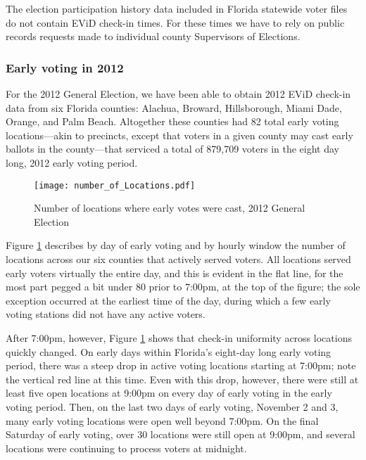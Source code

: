 \documentclass[12pt,titlepage]{article}
\begin{document}
The election participation history data included in Florida statewide
voter files do not contain EViD check-in times.  For these times we
have to rely on public records requests made to individual county
Supervisors of Elections.

\subsubsection*{Early voting in 2012}

For the 2012 General Election, we have been able to obtain 2012 EViD
check-in data from six Florida counties: Alachua, Broward,
Hillsborough, Miami Dade, Orange, and Palm Beach.  Altogether these
counties had 82 total early voting locations---akin to precincts,
except that voters in a given county may cast early ballots in the
county---that serviced a total of 879,709 voters in the eight day
long, 2012 early voting
period.  %



\begin{figure}[!ht]
  \caption{Number of locations where early votes were cast, 2012
    General Election}
  \label{fig:nrlocs2012}
  \centering
    \centering\texttt{[image: number\_of\_Locations.pdf]}
\end{figure}

Figure \ref{fig:nrlocs2012} describes by day of early voting and by
hourly window the number of locations across our six counties that
actively served voters.  All locations served early voters virtually
the entire day, and this is evident in the flat line, for the most
part pegged a bit under 80 prior to 7:00pm, at the top of the figure;
the sole exception occurred at the earliest time of the day, during
which a few early voting stations did not have any active voters.

After 7:00pm, however, Figure \ref{fig:nrlocs2012} shows that check-in
uniformity across locations quickly changed.  On early days within
Florida's eight-day long early voting period, there was a steep drop
in active voting locations starting at 7:00pm; note the vertical red
line at this time.  Even with this drop, however, there were still at
least five open locations at 9:00pm on every day of early voting in
the early voting period.  Then, on the last two days of early voting,
November 2 and 3, many early voting locations were open well beyond
7:00pm.  On the final Saturday of early voting, over 30 locations were
still open at 9:00pm, and several locations were continuing to process
voters at midnight.
\end{document}
